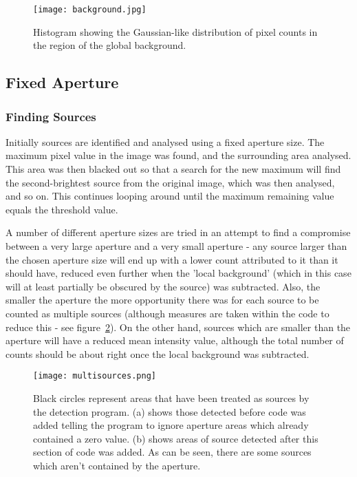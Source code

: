 \documentclass[a4paper,11pt,twoside]{article}
\begin{document}
\begin{figure}[htb]
  \centering
  \texttt{[image: background.jpg]}
  \caption{Histogram showing the Gaussian-like distribution of pixel counts in the region of the global background.} 
  \label{fig:background}
\end{figure}

\subsection{Fixed Aperture}

\subsubsection{Finding Sources}

Initially sources are identified and analysed using a fixed aperture size. The maximum pixel value in the image was found, and the surrounding area analysed. This area was then blacked out so that a search for the new maximum will find the second-brightest source from the original image, which was then analysed, and so on. This continues looping around until the maximum remaining value equals the threshold value.

A number of different aperture sizes are tried in an attempt to find a compromise between a very large aperture and a very small aperture - any source larger than the chosen aperture size will end up with a lower count attributed to it than it should have, reduced even further when the 'local background' (which in this case will at least partially be obscured by the source) was subtracted. Also, the smaller the aperture the more opportunity there was for each source to be counted as multiple sources (although measures are taken within the code to reduce this - see figure~\ref{fig:multisources}). On the other hand, sources which are smaller than the aperture will have a reduced mean intensity value, although the total number of counts should be about right once the local background was subtracted. 

\begin{figure}[htb]
  \centering
  \texttt{[image: multisources.png]}
  \caption{Black circles represent areas that have been treated as sources by the detection program. (a) shows those detected before code was added telling the program to ignore aperture areas which already contained a zero value. (b) shows areas of source detected after this section of code was added. As can be seen, there are some sources which aren't contained by the aperture.}
  \label{fig:multisources}
\end{figure}
\end{document}
